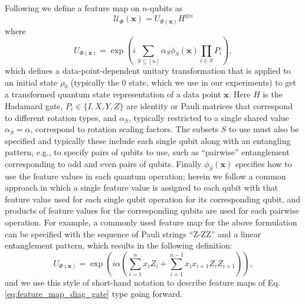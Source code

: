 \documentclass[reprint,amsfonts, amssymb, amsmath,  showkeys, nofootinbib,pra, superscriptaddress, twocolumn,longbibliography]{revtex4-2}
\renewcommand{\vec}[1]{\boldsymbol{#1}}  %
\begin{document}

Following \cite{havlivcek2019supervised} we define a feature map on $n$-qubits as 
\begin{equation}
  \label{eq:feature_map}
  {\mathcal{U}}_{\Phi}(\vec{x})=U_{\Phi(\vec{x})}H^{{\otimes}n}
\end{equation}
where
\begin{equation}
  \label{eq:feature_map_diag_gate}
U_{\Phi(\vec{x})}=\exp\left(i\sum_{S\subseteq [n]}
\alpha_S \phi_S(\vec{x})\prod_{i\in S} P_i\right),
\end{equation}
which defines a data-point-dependent unitary transformation that is applied to an initial state $\rho_0$ (typically the $0$ state, which we use in our experiments) to get a transformed quantum state representation of a data point $\vec{x}$.   
Here $H$ is the Hadamard gate, $P_i \in \{ I, X, Y, Z \}$ are identity or Pauli matrices that correspond to different rotation types, and $\alpha_S$, typically restricted to a single shared value $\alpha_S = \alpha$, correspond to rotation scaling factors.  The subsets $S$ to use must also be specified and typically these include each single qubit along with an entangling pattern, e.g., to specify pairs of qubits to use, such as ``pairwise'' entanglement corresponding to odd and even pairs of qubits.  Finally $\phi_S(\vec{x})$ specifies how to use the feature values in each quantum operation; herein we follow a common approach in which a single feature value is assigned to each qubit with that feature value used for each single qubit operation for its corresponding qubit, and products of feature values for the corresponding qubits are used for each pairwise operation.  For example, a commonly used feature map for the above formulation can be specified with the sequence of Pauli strings ``Z-ZZ'' and a linear entanglement pattern, which results in the following definition:
\begin{equation}
  \label{eq:z_zz_fmap}
U_{\Phi(\vec{x})}=\exp\left(i \alpha (\sum_{i=1}^{n} x_i Z_i + \sum_{i=1}^{n-1} x_i x_{i+1} Z_i Z_{i+1}) \right),
\end{equation}
and we use this style of short-hand notation to describe feature maps of Eq. \ref{eq:feature_map_diag_gate} type going forward.
\end{document}
